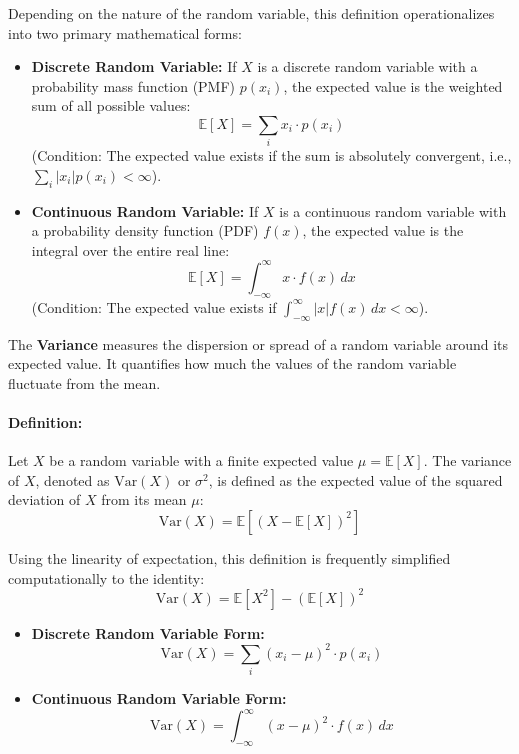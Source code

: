 \documentclass[12pt]{article}
\begin{document}
Depending on the nature of the random variable, this definition operationalizes into two primary mathematical forms:
\begin{itemize}
    \item \textbf{Discrete Random Variable:} If $X$ is a discrete random variable with a probability mass function (PMF) $p(x_i)$, the expected value is the weighted sum of all possible values:
    \[
    \mathbb{E}[X] = \sum_{i} x_i \cdot p(x_i)
    \]
    (Condition: The expected value exists if the sum is absolutely convergent, i.e., $\sum_{i} |x_i| p(x_i) < \infty$).
    
    \item \textbf{Continuous Random Variable:} If $X$ is a continuous random variable with a probability density function (PDF) $f(x)$, the expected value is the integral over the entire real line:
    \[
    \mathbb{E}[X] = \int_{-\infty}^{\infty} x \cdot f(x) \, dx
    \]
    (Condition: The expected value exists if $\int_{-\infty}^{\infty} |x| f(x) \, dx < \infty$).
\end{itemize}


The \textbf{Variance} measures the dispersion or spread of a random variable around its expected value. It quantifies how much the values of the random variable fluctuate from the mean.

\paragraph{Definition:}
Let $X$ be a random variable with a finite expected value $\mu = \mathbb{E}[X]$. The variance of $X$, denoted as $\text{Var}(X)$ or $\sigma^2$, is defined as the expected value of the squared deviation of $X$ from its mean $\mu$:
\[
\text{Var}(X) = \mathbb{E}\left[(X - \mathbb{E}[X])^2\right]
\]

Using the linearity of expectation, this definition is frequently simplified computationally to the identity:
\[
\text{Var}(X) = \mathbb{E}[X^2] - (\mathbb{E}[X])^2
\]

\begin{itemize}
    \item \textbf{Discrete Random Variable Form:}
    \[
    \text{Var}(X) = \sum_{i} (x_i - \mu)^2 \cdot p(x_i)
    \]
    
    \item \textbf{Continuous Random Variable Form:}
    \[
    \text{Var}(X) = \int_{-\infty}^{\infty} (x - \mu)^2 \cdot f(x) \, dx
    \]
\end{itemize}
\end{document}
